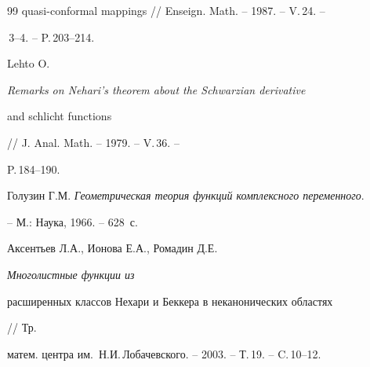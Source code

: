 \begin{thebibliography}{99}
{quasi-conformal mappings} // Enseign. Math. -- 1987. -- V.\,24. --


\No\,3--4. -- P.\,203--214.




Lehto O. {\em Remarks on Nehari's theorem about the Schwarzian derivative 


and schlicht functions} // J. Anal. Math. -- 1979.  -- V.\,36. --


P.\,184--190.




Голузин Г.М. {\em Геометрическая теория функций комплексного переменного}. 


-- М.: Наука, 1966. -- 628~с.




Аксентьев Л.А., Ионова Е.А., Ромадин Д.Е. {\em Многолистные функции из 


расширенных классов Нехари и Беккера в неканонических областях} // Тр.


матем. центра им.~Н.И.\,Лобачевского. -- 2003. -- Т.\,19. -- C.\,10--12.





\end{thebibliography}





\vskip 2cm












\label{end}





